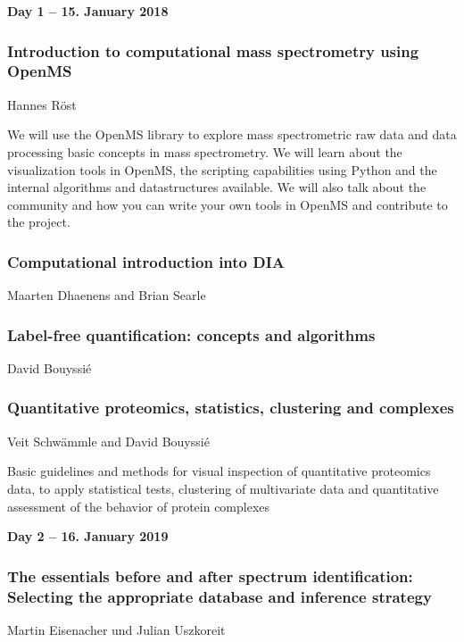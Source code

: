 
\noindent\textbf{Day 1 -- 15. January 2018}

\subsubsection*{\color{eubicRed} Introduction to computational mass spectrometry using OpenMS}
{\color{eubicGray}Hannes Röst}

We will use the OpenMS library to explore mass spectrometric raw data and data
processing basic concepts in mass spectrometry. We will learn about the
visualization tools in OpenMS, the scripting capabilities using Python and the
internal algorithms and datastructures available. We will also talk about the
community and how you can write your own tools in OpenMS and contribute to the
project.

\subsubsection*{\color{eubicRed} Computational introduction into DIA}
{\color{eubicGray}Maarten Dhaenens and Brian Searle}

\subsubsection*{\color{eubicRed} Label-free quantification: concepts and algorithms}
{\color{eubicGray}David Bouyssié}

\subsubsection*{\color{eubicRed} Quantitative proteomics, statistics, clustering and complexes}
{\color{eubicGray}Veit Schwämmle and David Bouyssié}

Basic guidelines and methods for visual inspection of quantitative proteomics data, to apply statistical tests, clustering of multivariate data and quantitative assessment of the behavior of protein complexes

\vspace{1cm}
\noindent\textbf{Day 2 -- 16. January 2019}

\subsubsection*{\color{eubicRed} The essentials before and after spectrum identification: Selecting the appropriate database and inference strategy}
{\color{eubicGray}Martin Eisenacher und Julian Uszkoreit}


